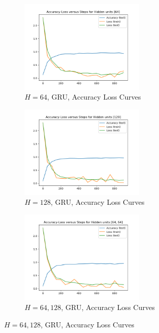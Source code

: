 \begin{figure}[!htbp]
\begin{subfigure}
\centering
\includegraphics[angle=0,width=0.65\textwidth]{assign-3/logs/Q1-MNIST-GRU-[64].png}
\caption{$H=64$, GRU, Accuracy Loss Curves}
\end{subfigure}
\begin{subfigure}
\centering
\includegraphics[angle=0,width=0.65\textwidth]{assign-3/logs/Q1-MNIST-GRU-[128].png}
\caption{$H=128$, GRU, Accuracy Loss Curves}
\end{subfigure}
\begin{subfigure}
\centering
\includegraphics[angle=0,width=0.65\textwidth]{assign-3/logs/Q1-MNIST-GRU-[64, 64].png}
\caption{$H=64, 128$, GRU, Accuracy Loss Curves}
\end{subfigure}
\end{figure}

